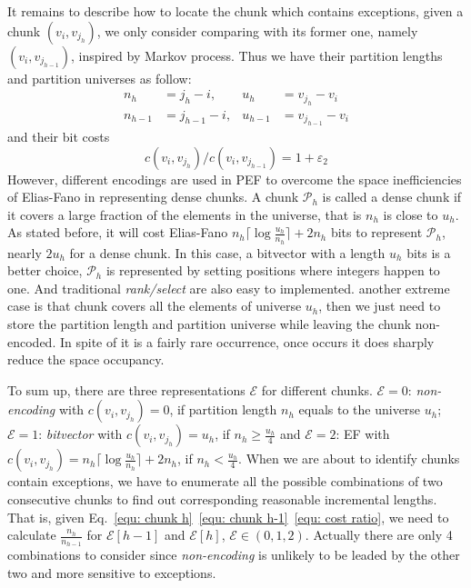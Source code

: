 \documentclass[runningheads,a4paper]{llncs}
\begin{document}
It remains to describe how to locate the chunk which contains exceptions, given a chunk $\left(v_{i},v_{j_{h}}\right)$, we only consider comparing with its former one, namely $\left(v_{i},v_{j_{h-1}}\right)$, inspired by Markov process.
Thus we have their partition lengths and partition universes as follow:
\begin{align}
n_{h} &= j_{h}-i, & u_{h} &= v_{j_{h}} - v_{i} \label{equ: chunk h}\\
n_{h-1} &= j_{h-1}-i, &  u_{h-1} &= v_{j_{h-1}} - v_{i}\label{equ: chunk h-1}
\end{align}
and their bit costs
\begin{equation}\label{equ: cost ratio}
{c\left(v_{i},v_{j_{h}}\right)}/{c\left(v_{i},v_{j_{h-1}}\right)}=1+\varepsilon_{2}
\end{equation}
However, different encodings are used in PEF to overcome the space inefficiencies of Elias-Fano in representing dense chunks.
A chunk $ \mathcal{P}_{h} $ is called a dense chunk if it covers a large fraction of the elements in the universe, that is $ n_{h} $ is close to $ u_{h} $.
As stated before, it will cost Elias-Fano $ n_{h} \lceil \log \frac{u_{h}}{n_{h}} \rceil + 2 n_{h} $ bits to represent $ \mathcal{P}_{h} $, nearly $ 2 u_{h} $ for a dense chunk.
In this case, a bitvector with a length $ u_{h} $ bits is a better choice, $ \mathcal{P}_{h} $ is represented by setting positions where integers happen to one.
And traditional \textit{rank/select} are also easy to implemented.
another extreme case is that chunk covers all the elements of universe $ u_{h} $, then we just need to store the partition length and partition universe while leaving the chunk non-encoded.
In spite of it is a fairly rare occurrence, once occurs it does sharply reduce the space occupancy.

To sum up, there are three representations $ \mathcal{E} $ for different chunks. $ \mathcal{E}=0 $: \textit{non-encoding} with $c\left(v_{i},v_{j_{h}}\right)=0$, if partition length $n_{h}$ equals to the universe $u_{h}$; $ \mathcal{E}=1 $: \textit{bitvector} with $c\left(v_{i},v_{j_{h}}\right)=u_{h}$, if $n_{h}\geqslant \frac{u_{h}}{4}$ and $ \mathcal{E}=2 $: EF with $c\left(v_{i},v_{j_{h}}\right)=n_{h}\lceil\log \frac{u_{h}}{n_{h}}\rceil+2n_{h}$, if $n_{h}<\frac{u_{h}}{4}$.
When we are about to identify chunks contain exceptions, we have to enumerate all the possible combinations of two consecutive chunks to find out corresponding reasonable incremental lengths.
That is, given Eq.~\eqref{equ: chunk h}~\eqref{equ: chunk h-1}~\eqref{equ: cost ratio}, we need to calculate $ \frac{n_h}{n_{h-1}} $ for $ \mathcal{E}[h-1] $ and $ \mathcal{E}[h] $, $ \mathcal{E} \in (0,1,2) $.
Actually there are only 4 combinations to consider since \textit{non-encoding} is unlikely to be leaded by the other two and more sensitive to exceptions.
\end{document}
